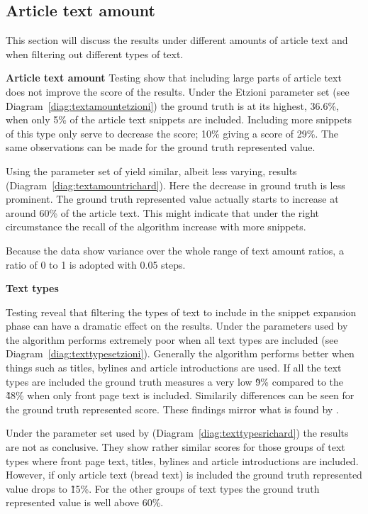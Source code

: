 \subsection{Article text amount}

This section will discuss the results under different amounts of article text and when filtering out different types of text.

\textbf{Article text amount}
Testing show that including large parts of article text does not improve the score of the results. Under the Etzioni parameter set (see Diagram~\ref{diag:textamountetzioni}) the ground truth is at its highest, 36.6\%, when only 5\% of the article text snippets are included. Including more snippets of this type only serve to decrease the score; 10\% giving a score of 29\%. The same observations can be made for the ground truth represented value.

Using the parameter set of \supervisor yield similar, albeit less varying, results (Diagram~\ref{diag:textamountrichard}). Here the decrease in ground truth is less prominent. The ground truth represented value actually starts to increase at around 60\% of the article text. This might indicate that under the right circumstance the recall of the algorithm increase with more snippets.

Because the data show variance over the whole range of text amount ratios, a ratio of 0 to 1 is adopted with 0.05 steps.

\textbf{Text types}

Testing reveal that filtering the types of text to include in the snippet expansion phase can have a dramatic effect on the results. Under the parameters used by \citeauthor{Oren1998} the algorithm performs extremely poor when all text types are included (see Diagram~\ref{diag:texttypesetzioni}). Generally the algorithm performs better when things such as titles, bylines and article introductions are used. If all the text types are included the ground truth measures a very low \~ 9\% compared to the \~ 48\% when only front page text is included. Similarily differences can be seen for the ground truth represented score. These findings mirror what is found by \citeauthor{Oren1998}.

Under the parameter set used by \supervisor (Diagram~\ref{diag:texttypesrichard}) the results are not as conclusive. They show rather similar scores for those groups of text types where front page text, titles, bylines and article introductions are included. However, if only article text (bread text) is included the ground truth represented value drops to \~ 15\%. For the other groups of text types the ground truth represented value is well above 60\%.

